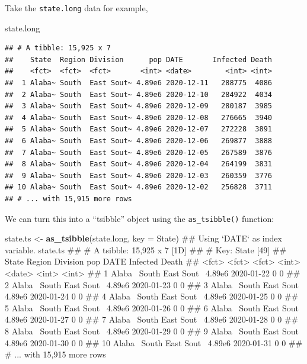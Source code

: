 \documentclass[]{book}
\newenvironment{Shaded}{\begin{snugshade}}{\end{snugshade}}
\newcommand{\KeywordTok}[1]{\textcolor[rgb]{0.13,0.29,0.53}{\textbf{#1}}}
\newcommand{\DataTypeTok}[1]{\textcolor[rgb]{0.13,0.29,0.53}{#1}}
\newcommand{\StringTok}[1]{\textcolor[rgb]{0.31,0.60,0.02}{#1}}
\newcommand{\NormalTok}[1]{#1}
\begin{document}
Take the \texttt{state.long} data for example,

\begin{Shaded}
\begin{Highlighting}[]
\NormalTok{state.long}
\end{Highlighting}
\end{Shaded}

\begin{verbatim}
## # A tibble: 15,925 x 7
##    State  Region Division      pop DATE       Infected Death
##    <fct>  <fct>  <fct>       <int> <date>        <int> <int>
##  1 Alaba~ South  East Sout~ 4.89e6 2020-12-11   288775  4086
##  2 Alaba~ South  East Sout~ 4.89e6 2020-12-10   284922  4034
##  3 Alaba~ South  East Sout~ 4.89e6 2020-12-09   280187  3985
##  4 Alaba~ South  East Sout~ 4.89e6 2020-12-08   276665  3940
##  5 Alaba~ South  East Sout~ 4.89e6 2020-12-07   272228  3891
##  6 Alaba~ South  East Sout~ 4.89e6 2020-12-06   269877  3888
##  7 Alaba~ South  East Sout~ 4.89e6 2020-12-05   267589  3876
##  8 Alaba~ South  East Sout~ 4.89e6 2020-12-04   264199  3831
##  9 Alaba~ South  East Sout~ 4.89e6 2020-12-03   260359  3776
## 10 Alaba~ South  East Sout~ 4.89e6 2020-12-02   256828  3711
## # ... with 15,915 more rows
\end{verbatim}

We can turn this into a ``tsibble'' object using the
\texttt{as\_tsibble()} function:

\begin{Shaded}
\begin{Highlighting}[]
\NormalTok{state.ts <-}\StringTok{ }\KeywordTok{as_tsibble}\NormalTok{(state.long, }\DataTypeTok{key =}\NormalTok{ State) }
\NormalTok{## Using `DATE` as index variable.}
\NormalTok{state.ts}
\NormalTok{## # A tsibble: 15,925 x 7 [1D]}
\NormalTok{## # Key:       State [49]}
\NormalTok{##    State  Region Division      pop DATE       Infected Death}
\NormalTok{##    <fct>  <fct>  <fct>       <int> <date>        <int> <int>}
\NormalTok{##  1 Alaba~ South  East Sout~ 4.89e6 2020-01-22        0     0}
\NormalTok{##  2 Alaba~ South  East Sout~ 4.89e6 2020-01-23        0     0}
\NormalTok{##  3 Alaba~ South  East Sout~ 4.89e6 2020-01-24        0     0}
\NormalTok{##  4 Alaba~ South  East Sout~ 4.89e6 2020-01-25        0     0}
\NormalTok{##  5 Alaba~ South  East Sout~ 4.89e6 2020-01-26        0     0}
\NormalTok{##  6 Alaba~ South  East Sout~ 4.89e6 2020-01-27        0     0}
\NormalTok{##  7 Alaba~ South  East Sout~ 4.89e6 2020-01-28        0     0}
\NormalTok{##  8 Alaba~ South  East Sout~ 4.89e6 2020-01-29        0     0}
\NormalTok{##  9 Alaba~ South  East Sout~ 4.89e6 2020-01-30        0     0}
\NormalTok{## 10 Alaba~ South  East Sout~ 4.89e6 2020-01-31        0     0}
\NormalTok{## # ... with 15,915 more rows}
\end{Highlighting}
\end{Shaded}
\end{document}
